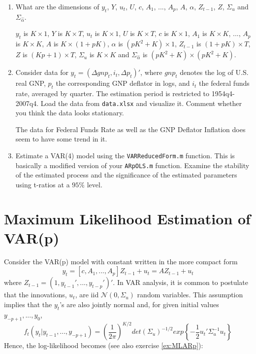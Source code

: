 \documentclass[a4paper]{scrartcl}
\begin{document}
    \begin{enumerate}
        \item What are the dimensions of $y_t$, $Y$, $u_t$, $U$, $c$, $A_1$, ..., $A_p$, $A$, $\alpha$, $Z_{t-1}$, $Z$, $\Sigma_u$ and $\Sigma_{\hat{\alpha}}$.
              \begin{solution}		
                  $y_t$ is $K \times 1$, $Y$ is $K \times T$, $u_t$ is $K \times 1$, $U$ is $K \times T$, $c$ is $K \times 1$, $A_1$ is $K \times K$, ..., $A_p$ is $K \times K$, $A$ is $K \times (1+pK)$, $\alpha$ is $(pK^2+K) \times 1$, $Z_{t-1}$ is $(1+pK) \times T$, $Z$ is $(Kp+1) \times T$, $\Sigma_u$ is $K \times K$ and $\Sigma_{\hat{\alpha}}$ is $(pK^2+K) \times (pK^2+K)$.
              \end{solution}
        \item Consider data for $y_t = (\Delta gnp_t,i_t,\Delta p_t)'$, where $gnp_t$ denotes the log of U.S. real GNP, $p_t$ the corresponding GNP deflator in logs, and $i_t$ the federal funds rate, averaged by quarter. The estimation period is restricted to 1954q4-2007q4. Load the data from  \texttt{data.xlsx} and visualize it. Comment whether you think the data looks stationary.
              \begin{solution}
                  The data for Federal Funds Rate as well as the GNP Deflator Inflation does seem to have some trend in it.
              \end{solution}
        \item Estimate a VAR(4) model using the \texttt{VARReducedForm.m} function. This is basically a modified version of your \texttt{ARpOLS.m} function. Examine the stability of the estimated process and the significance of the estimated parameters using t-ratios at a $95\%$ level.
              \begin{solution}
                  
              \end{solution}
    \end{enumerate}
    
    \section{Maximum Likelihood Estimation of VAR(p)}
    Consider the VAR(p) model with constant written in the more compact form
    $$ y_t = [c, A_1, ..., A_p] Z_{t-1} + u_t = A Z_{t-1}+ u_t$$
    where $Z_{t-1}=(1,y_{t-1}',...,y_{t-p}')'$. In VAR analysis, it is common to postulate that the innovations, $u_t$, are iid $\mathcal{N}(0,\Sigma_u)$ random variables. This assumption implies that the $y_t$'s are also jointly normal and, for given initial values $y_{-p+1},...,y_{0}$,
    $$f_t(y_t|y_{t-1},...,y_{-p+1})=\left(\frac{1}{2\pi}\right)^{K/2} det(\Sigma_u)^{-1/2}exp\left\{-\frac{1}{2}u_t'\Sigma_u^{-1}u_t\right\}$$
    Hence, the log-likelihood becomes (see also exercise \ref{ex:MLARp}):
    
\end{document}
